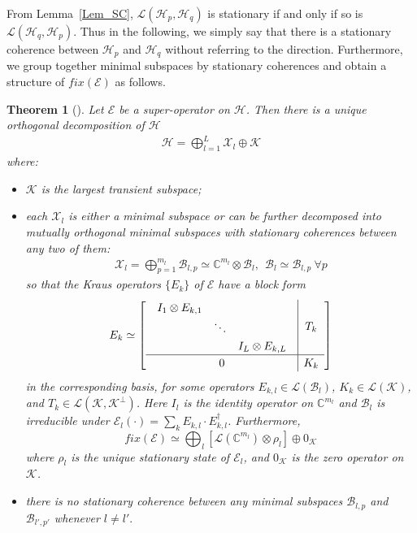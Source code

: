 \documentclass[journal]{IEEEtran}
\def\h{\ensuremath{\mathcal{H}}}
\def\l{\ensuremath{\mathcal{L}}}
\def\k{\ensuremath{\mathcal{K}}}
\def\x{\ensuremath{\mathcal{X}}}
\def\b{\ensuremath{\mathcal{B}}}
\def\e{\ensuremath{\mathcal{E}}}
\def\l{\ensuremath{\mathcal{L}}}
\def\l{\mathcal{L}}
\def\k{\mathcal{K}}
\newtheorem{theorem}{Theorem}
\begin{document}
 From Lemma~\ref{Lem_SC}, $\l(\h_p,\h_q)$ is stationary if and only if so is $\l(\h_q,\h_p)$. Thus in the following, we simply say that there is a stationary coherence between $\h_p$ and $\h_q$ without referring to the direction.
Furthermore,  we group together minimal subspaces by stationary coherences and obtain a structure of $fix(\e)$ as follows. 
\begin{theorem}[\cite{baumgartner2012structure}]\label{Theo_NS_Dec}
  Let $\e$ be a super-operator on $\h$. Then there is a unique  orthogonal decomposition of $\h$
  \begin{eqnarray}\label{Eq_NS_dec_unique}
    \h=\bigoplus_{l=1}^{L}\x_l\oplus \k
  \end{eqnarray}
  where: \begin{itemize}
    \item[(1)] $\k$ is the largest transient subspace;
    \item[(2)] each $\x_l$ is either a minimal subspace or can be further decomposed into mutually orthogonal minimal subspaces with stationary coherences between any two of them:
    \begin{eqnarray}\label{Eq_NS_dec}
      \x_l=\bigoplus_{p=1}^{m_l}\b_{l,p}\simeq\mathbb{C}^{m_l}\otimes \b_l, \ \ \b_l\simeq \b_{l,p} \ \forall p
    \end{eqnarray} 
    so that the Kraus operators $\{E_k\}$ of $\e$ have a block form
  \begin{eqnarray}\label{Eq_SC_dec_Kraus}
    \renewcommand{\arraystretch}{1.2}
E_k\simeq \left[\begin{array}{c|c}
  \begin{array}{ccc}
  I_{1}\otimes E_{k,1} &  &\\
   & \ddots &\\
   & & I_{L}\otimes E_{k,L}  
  \end{array} & T_k\\
  \hline
0&K_k
\end{array}\right]
  \end{eqnarray}
  in the corresponding basis, 
for some operators $E_{k,l}\in \l(\b_l)$, $K_k\in \l(\k)$, and $T_k\in\l(\k,\k^\perp)$. Here  $I_{l}$ is the identity operator on $\mathbb{C}^{m_l}$ and $\b_l$ is irreducible under $\e_{l}(\cdot)=\sum_{k}E_{k,l}\cdot E_{k,l}^\dagger$. Furthermore, 
$$fix(\e)\simeq\bigoplus_{l}[\l(\mathbb{C}^{m_l})\otimes \rho_{l}]\oplus 0_\k $$
    where $\rho_l$ is the unique stationary state of $\e_{l}$, and $0_\k$ is the zero operator on $\k$.
    \item[(3)] there is no stationary coherence between any minimal subspaces $\b_{l, p}$ and $\b_{l', p'}$ whenever $l\neq l'.$  
      \end{itemize}
\end{theorem}
\end{document}
